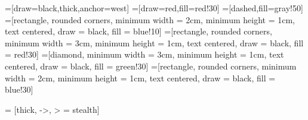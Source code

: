 \documentclass{article}
\begin{document}
	
\thispagestyle{empty} %

=[draw=black,thick,anchor=west]
=[draw=red,fill=red!30]
=[dashed,fill=gray!50]
=[rectangle, rounded corners, minimum width = 2cm, minimum height = 1cm, text centered, draw = black, fill = blue!10]
=[rectangle, rounded corners, minimum width = 3cm, minimum height = 1cm, text centered, draw = black, fill = red!30]
=[diamond, minimum width = 3cm, minimum height = 1cm, text centered, draw = black, fill = green!30]
=[rectangle, rounded corners, minimum width = 2cm, minimum height = 1cm, text centered, draw = black, fill = blue!30]

 = [thick, ->, > = stealth]
\end{document}
